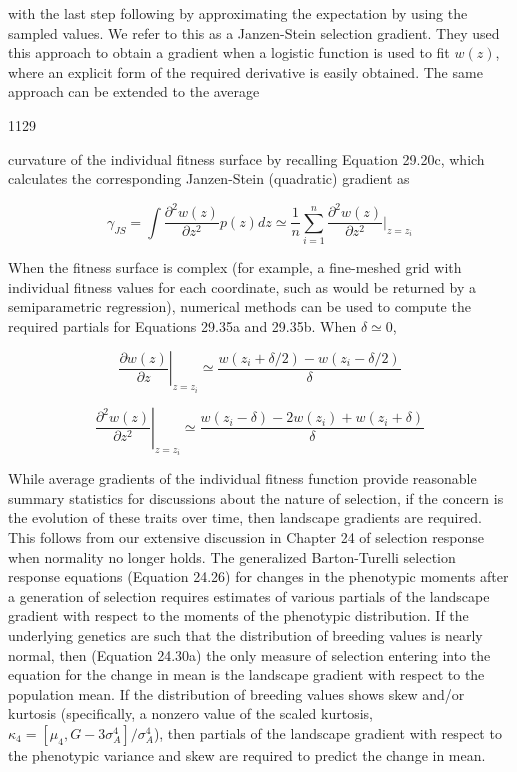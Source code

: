 \documentclass{article}
\begin{document}
with the last step following by approximating the expectation by using the sampled values. We refer to this as a Janzen-Stein selection gradient. They used this approach to obtain a gradient when a logistic function is used to fit  $ w(z) $, where an explicit form of the required derivative is easily obtained. The same approach can be extended to the average

1129

curvature of the individual fitness surface by recalling Equation 29.20c, which calculates the corresponding Janzen-Stein (quadratic) gradient as

\begin{equation}
\gamma_{JS}=\int\frac{\partial^{2}w(z)}{\partial z^{2}}p(z)dz\simeq\frac{1}{n}\sum_{i=1}^{n}\frac{\partial^{2}w(z)}{\partial z^{2}}\bigg|_{z=z_{i}}
\tag{29.35b}
\label{eq:29_35b}
\end{equation}

When the fitness surface is complex (for example, a fine-meshed grid with individual fitness values for each coordinate, such as would be returned by a semiparametric regression), numerical methods can be used to compute the required partials for Equations 29.35a and 29.35b. When  $ \delta \simeq 0 $,

\begin{equation}
\left.\frac{\partial w(z)}{\partial z}\right|_{z=z_{i}}\simeq\frac{w(z_{i}+\delta/2)-w(z_{i}-\delta/2)}{\delta}
\tag{29.35c}
\label{eq:29_35c}
\end{equation}

\begin{equation}
\left.\frac{\partial^{2}w(z)}{\partial z^{2}}\right|_{z=z_{i}}\simeq\frac{w(z_{i}-\delta)-2w(z_{i})+w(z_{i}+\delta)}{\delta}
\end{equation}

While average gradients of the individual fitness function provide reasonable summary statistics for discussions about the nature of selection, if the concern is the evolution of these traits over time, then landscape gradients are required. This follows from our extensive discussion in Chapter 24 of selection response when normality no longer holds. The generalized Barton-Turelli selection response equations (Equation 24.26) for changes in the phenotypic moments after a generation of selection requires estimates of various partials of the landscape gradient with respect to the moments of the phenotypic distribution. If the underlying genetics are such that the distribution of breeding values is nearly normal, then (Equation 24.30a) the only measure of selection entering into the equation for the change in mean is the landscape gradient with respect to the population mean. If the distribution of breeding values shows skew and/or kurtosis (specifically, a nonzero value of the scaled kurtosis,  $ \kappa_4 = [\mu_4, G - 3\sigma_A^4] / \sigma_A^4 $), then partials of the landscape gradient with respect to the phenotypic variance and skew are required to predict the change in mean.
\end{document}
